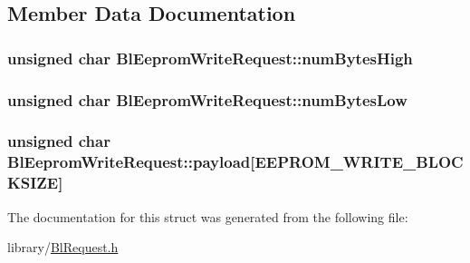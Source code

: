\subsection{Member Data Documentation}
\hypertarget{struct_bl_eeprom_write_request_ab048ccd01058cf6713bd40b7120f9584}{
\subsubsection[{num\-Bytes\-High}]{\setlength{\rightskip}{0pt plus 5cm}unsigned char Bl\-Eeprom\-Write\-Request\-::num\-Bytes\-High}}\label{struct_bl_eeprom_write_request_ab048ccd01058cf6713bd40b7120f9584}
\hypertarget{struct_bl_eeprom_write_request_a99a5d20f83d1fac437f3f54703d40e14}{
\subsubsection[{num\-Bytes\-Low}]{\setlength{\rightskip}{0pt plus 5cm}unsigned char Bl\-Eeprom\-Write\-Request\-::num\-Bytes\-Low}}\label{struct_bl_eeprom_write_request_a99a5d20f83d1fac437f3f54703d40e14}
\hypertarget{struct_bl_eeprom_write_request_a55b1312edf28cfa81d1ca266c986ad72}{
\subsubsection[{payload}]{\setlength{\rightskip}{0pt plus 5cm}unsigned char Bl\-Eeprom\-Write\-Request\-::payload\mbox{[}{\bf E\-E\-P\-R\-O\-M\-\_\-\-W\-R\-I\-T\-E\-\_\-\-B\-L\-O\-C\-K\-S\-I\-Z\-E}\mbox{]}}}\label{struct_bl_eeprom_write_request_a55b1312edf28cfa81d1ca266c986ad72}


The documentation for this struct was generated from the following file\-:\begin{DoxyCompactItemize}
\item 
library/\hyperlink{_bl_request_8h}{Bl\-Request.\-h}\end{DoxyCompactItemize}
